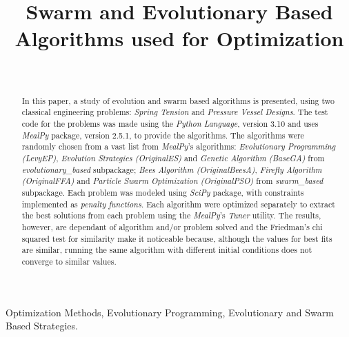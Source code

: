 \documentclass[conference]{IEEEtran}
\begin{document}
\title{Swarm and Evolutionary Based Algorithms used for Optimization}
\author{
	\\
}

\maketitle


\begin{abstract}
    In this paper, a study of evolution and swarm based algorithms is presented,
    using two classical engineering problems: \textit{Spring Tension} and \textit{Pressure Vessel
    Designs}. The test code for the problems was made using the \textit{Python Language},
    version 3.10 and uses \textit{MealPy} package, version 2.5.1,  to provide the algorithms.
    The algorithms were randomly chosen from a vast list from \textit{MealPy}'s algorithms:
    \textit{Evolutionary Programming (LevyEP)}, \textit{Evolution Strategies (OriginalES)} and
    \textit{Genetic Algorithm (BaseGA)} from \textit{evolutionary\_based} subpackage;
    \textit{Bees Algorithm (OriginalBeesA)}, \textit{Firefly Algorithm (OriginalFFA)} and
    \textit{Particle Swarm Optimization (OriginalPSO)} from \textit{swarm\_based} subpackage.
    Each problem was modeled using \textit{SciPy} package, with constraints implemented as
    \textit{penalty functions}. Each algorithm were optimized separately to extract the best
    solutions from each problem using the \textit{MealPy}'s \textit{Tuner} utility.
    The results, however, are dependant of algorithm and/or problem solved and the Friedman's chi
    squared test for similarity make it noticeable because, although the values for best fits are
    similar, running the same algorithm with different initial conditions does not converge to similar
    values.
\end{abstract}

\begin{IEEEkeywords}
	Optimization Methods, Evolutionary Programming, Evolutionary and Swarm Based Strategies.
\end{IEEEkeywords}
\end{document}
